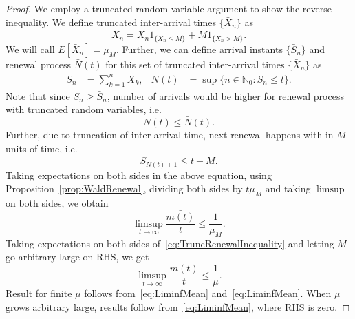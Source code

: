 \documentclass[a4paper,10pt]{article}
\theoremstyle{plain}
\theoremstyle{definition}
\begin{document}
\begin{proof}
We employ a truncated random variable argument to show the reverse inequality. We define truncated inter-arrival times $\{\bar{X}_n\}$ as 
\begin{equation*}
\bar{X}_n = X_n 1_{\{X_n \leq M\}} + M1_{\{X_n > M\}}.
\end{equation*}
We will call $E[\bar{X}_n] = \mu_M$. Further, we can define arrival instants $\{\bar{S}_n\}$ and renewal process $\bar{N}(t)$ for this set of truncated inter-arrival times $\{\bar{X}_n\}$ as 
\begin{align*}
 \bar{S}_n &= \sum_{k=1}^n \bar{X}_k, & \bar{N}(t) &= \sup\{n \in \mathbb{N}_0: \bar{S}_n \leq t\}.
\end{align*}
Note that since $S_n \geq \bar{S}_n$, number of arrivals would be higher for renewal process with truncated random variables, i.e. 
\begin{equation}
\label{eq:TruncRenewalInequality}
  N(t) \leq \bar{N}(t).
\end{equation}
Further, due to truncation of inter-arrival time, next renewal happens with-in $M$ units of time, i.e.
\begin{equation*}
  \bar{S}_{N(t)+1} \leq t+M.
\end{equation*}
Taking expectations on both sides in the above equation, using Proposition~\ref{prop:WaldRenewal}, dividing both sides by $t \mu_M$ and taking $\limsup$ on both sides, we obtain
\begin{equation*}
\limsup_{t \to \infty}\frac{\bar{m(t)}}{t} \leq \frac{1}{\mu_M}.
\end{equation*}
Taking expectations on both sides of~\eqref{eq:TruncRenewalInequality} and letting $M$ go arbitrary large on RHS, we get
\begin{equation}
\label{eq:LimsupMean}
\limsup_{t \to \infty}\frac{m(t)}{t} \leq \frac{1}{\mu}.
\end{equation}
Result for finite $\mu$ follows from~\eqref{eq:LiminfMean} and~\eqref{eq:LiminfMean}. When $\mu$ grows arbitrary large, results follow from~\eqref{eq:LiminfMean}, where RHS is zero. 
\end{proof}
\end{document}
